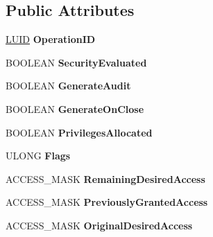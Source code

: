 \subsection*{Public Attributes}
\begin{DoxyCompactItemize}
\item 
\hypertarget{struct__ACCESS__STATE_ae221bb4ee81e5335ac4df362d7b66717}{}\hyperlink{struct__LUID}{L\+U\+I\+D} {\bfseries Operation\+I\+D}\label{struct__ACCESS__STATE_ae221bb4ee81e5335ac4df362d7b66717}

\item 
\hypertarget{struct__ACCESS__STATE_aaf29091165b93a8e84d58ce652c40714}{}B\+O\+O\+L\+E\+A\+N {\bfseries Security\+Evaluated}\label{struct__ACCESS__STATE_aaf29091165b93a8e84d58ce652c40714}

\item 
\hypertarget{struct__ACCESS__STATE_adf96f66d1179a6b1e5aaf638c5f477be}{}B\+O\+O\+L\+E\+A\+N {\bfseries Generate\+Audit}\label{struct__ACCESS__STATE_adf96f66d1179a6b1e5aaf638c5f477be}

\item 
\hypertarget{struct__ACCESS__STATE_ad31aab57c62b344a33b073e5433d425d}{}B\+O\+O\+L\+E\+A\+N {\bfseries Generate\+On\+Close}\label{struct__ACCESS__STATE_ad31aab57c62b344a33b073e5433d425d}

\item 
\hypertarget{struct__ACCESS__STATE_af14834158b4a3cf4c6fed25c34183ca5}{}B\+O\+O\+L\+E\+A\+N {\bfseries Privileges\+Allocated}\label{struct__ACCESS__STATE_af14834158b4a3cf4c6fed25c34183ca5}

\item 
\hypertarget{struct__ACCESS__STATE_a4801060e23c4cefa88fbf3e26b98a54f}{}U\+L\+O\+N\+G {\bfseries Flags}\label{struct__ACCESS__STATE_a4801060e23c4cefa88fbf3e26b98a54f}

\item 
\hypertarget{struct__ACCESS__STATE_a8dae0d10dc7ebf84367bdad779328e1e}{}A\+C\+C\+E\+S\+S\+\_\+\+M\+A\+S\+K {\bfseries Remaining\+Desired\+Access}\label{struct__ACCESS__STATE_a8dae0d10dc7ebf84367bdad779328e1e}

\item 
\hypertarget{struct__ACCESS__STATE_a5712ba2a1297f96e003d15029607ef48}{}A\+C\+C\+E\+S\+S\+\_\+\+M\+A\+S\+K {\bfseries Previously\+Granted\+Access}\label{struct__ACCESS__STATE_a5712ba2a1297f96e003d15029607ef48}

\item 
\hypertarget{struct__ACCESS__STATE_a6815968e85776a2b1829f31593894e9c}{}A\+C\+C\+E\+S\+S\+\_\+\+M\+A\+S\+K {\bfseries Original\+Desired\+Access}\label{struct__ACCESS__STATE_a6815968e85776a2b1829f31593894e9c}


\end{DoxyCompactItemize}
